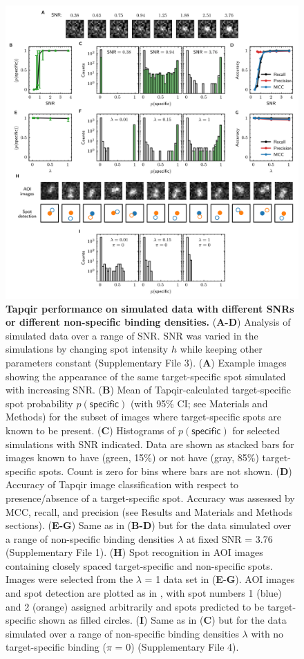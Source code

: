 \begin{figure}
\begin{fullwidth}
\includegraphics[width=183mm]{figures/tapqir_performance.png}
\caption{\textbf{Tapqir performance on simulated data with different SNRs or different non-specific binding densities.} (\textbf{A-D}) Analysis of simulated data over a range of SNR. SNR was varied in the simulations by changing spot intensity  $h$ while keeping other parameters constant (Supplementary File 3). (\textbf{A}) Example images showing the appearance of the same target-specific spot simulated with increasing SNR.   (\textbf{B}) Mean of Tapqir-calculated target-specific spot probability $p(\mathsf{specific})$ (with 95\% CI; see Materials and Methods) for the subset of images where target-specific spots  are known to be present. (\textbf{C}) Histograms of $p(\mathsf{specific})$ for selected simulations with SNR indicated. Data are shown as stacked bars for images known to have (green, 15\%) or not have (gray, 85\%) target-specific spots.  Count is zero for bins where bars are not shown. (\textbf{D}) Accuracy of Tapqir image classification with respect to presence/absence of a target-specific spot. Accuracy was assessed by MCC, recall, and precision (see Results and Materials and Methods sections). (\textbf{E-G}) Same as in (\textbf{B-D}) but for the data simulated over a range of non-specific binding densities $\lambda$ at fixed SNR = 3.76 (Supplementary File 1). (\textbf{H}) Spot recognition in AOI images containing closely spaced target-specific and non-specific spots.  Images were selected from the $\lambda$ = 1 data set in (\textbf{E}-\textbf{G}). AOI images and spot detection are plotted as in , with spot numbers 1 (blue) and 2 (orange) assigned arbitrarily and spots predicted to be target-specific shown as filled circles. (\textbf{I}) Same as in (\textbf{C}) but for the data simulated over a range of non-specific binding densities $\lambda$ with no target-specific binding ($\pi$ = 0) (Supplementary File 4).}

\end{fullwidth}
\end{figure}
